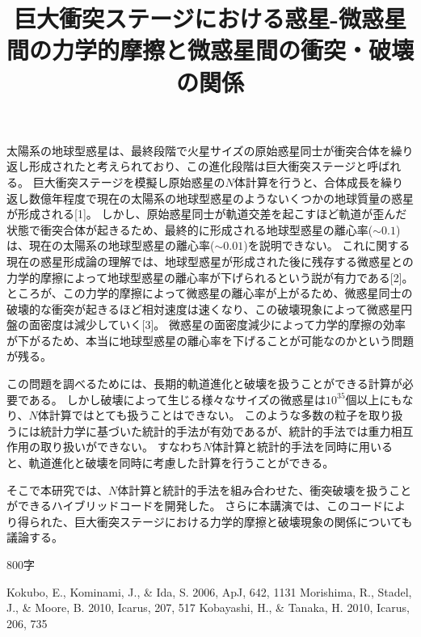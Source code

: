 \documentclass[11pt,a4paper]{jarticle}
\title{巨大衝突ステージにおける惑星-微惑星間の力学的摩擦と微惑星間の衝突・破壊の関係}
\begin{document}
\maketitle


太陽系の地球型惑星は、最終段階で火星サイズの原始惑星同士が衝突合体を繰り返し形成されたと考えられており、この進化段階は巨大衝突ステージと呼ばれる。
巨大衝突ステージを模擬し原始惑星の$N$体計算を行うと、合体成長を繰り返し数億年程度で現在の太陽系の地球型惑星のようないくつかの地球質量の惑星が形成される[1]。
しかし、原始惑星同士が軌道交差を起こすほど軌道が歪んだ状態で衝突合体が起きるため、最終的に形成される地球型惑星の離心率($\sim0.1$)は、現在の太陽系の地球型惑星の離心率($\sim0.01$)を説明できない。
これに関する現在の惑星形成論の理解では、地球型惑星が形成された後に残存する微惑星との力学的摩擦によって地球型惑星の離心率が下げられるという説が有力である[2]。
ところが、この力学的摩擦によって微惑星の離心率が上がるため、微惑星同士の破壊的な衝突が起きるほど相対速度は速くなり、この破壊現象によって微惑星円盤の面密度は減少していく[3]。
微惑星の面密度減少によって力学的摩擦の効率が下がるため、本当に地球型惑星の離心率を下げることが可能なのかという問題が残る。
\par
この問題を調べるためには、長期的軌道進化と破壊を扱うことができる計算が必要である。
しかし破壊によって生じる様々なサイズの微惑星は$10^{35}$個以上にもなり、$N$体計算ではとても扱うことはできない。
このような多数の粒子を取り扱うには統計力学に基づいた統計的手法が有効であるが、統計的手法では重力相互作用の取り扱いができない。
すなわち$N$体計算と統計的手法を同時に用いると、軌道進化と破壊を同時に考慮した計算を行うことができる。
\par
そこで本研究では、$N$体計算と統計的手法を組み合わせた、衝突破壊を扱うことができるハイブリッドコードを開発した。
さらに本講演では、このコードにより得られた、巨大衝突ステージにおける力学的摩擦と破壊現象の関係についても議論する。
\par
800字
\par

\begin{thebibliography}{9}
  Kokubo, E., Kominami, J., \& Ida, S. 2006, ApJ, 642, 1131
  Morishima, R., Stadel, J., \& Moore, B. 2010, Icarus, 207, 517
  Kobayashi, H., \& Tanaka, H. 2010, Icarus, 206, 735
\end{thebibliography}
\end{document}
